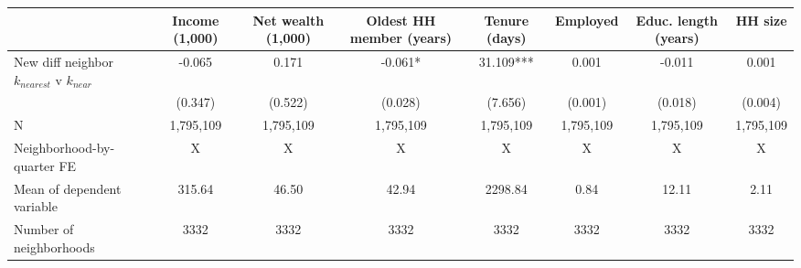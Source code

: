 \begin{tabular}[t]{lccccccc}
\toprule
  & Income (1,000) & Net wealth (1,000) & Oldest HH member (years) & Tenure (days) & Employed & Educ. length (years) & HH size\\
\midrule
New diff neighbor $k_{nearest}$ v $k_{near}$ & -0.065 & 0.171 & -0.061* & 31.109*** & 0.001 & -0.011 & 0.001\\
 & (0.347) & (0.522) & (0.028) & (7.656) & (0.001) & (0.018) & (0.004)\\
\midrule
N & 1,795,109 & 1,795,109 & 1,795,109 & 1,795,109 & 1,795,109 & 1,795,109 & 1,795,109\\
Neighborhood-by-quarter FE & X & X & X & X & X & X & X\\
Mean of dependent variable & 315.64 & 46.50 & 42.94 & 2298.84 & 0.84 & 12.11 & 2.11\\
Number of neighborhoods & 3332 & 3332 & 3332 & 3332 & 3332 & 3332 & 3332\\
\bottomrule
\end{tabular}
